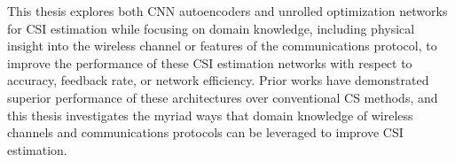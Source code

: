 This thesis explores both CNN autoencoders and unrolled optimization networks for CSI estimation while focusing on domain knowledge, including physical insight into the wireless channel or features of the communications protocol, to improve the performance of these CSI estimation networks with respect to accuracy, feedback rate, or network efficiency. Prior works have demonstrated superior performance of these architectures over conventional CS methods, and this thesis investigates the myriad ways that domain knowledge of wireless channels and communications protocols can be leveraged to improve CSI estimation.

